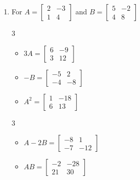 \documentclass{ximera}
\begin{document}
	\author{Stitz-Zeager}




\begin{enumerate}

\item For  $A = \left[ \begin{array}{rr} 2 & -3 \\ 1 & 4 \end{array} \right]$ and $B=\left[ \begin{array}{rr} 5 & -2 \\ 4 & 8 \end{array} \right]$ 

\begin{multicols}{3}
\begin{itemize}
\item  $3A = \left[ \begin{array}{rr} 6 & -9 \\ 3 & 12 \end{array} \right]$

\item $-B = \left[ \begin{array}{rr} -5 & 2 \\ -4 & -8 \end{array} \right]$

\item $A^2 = \left[ \begin{array}{rr} 1 & -18 \\ 6 & 13 \end{array} \right]$

\end{itemize}
\end{multicols}


\begin{multicols}{3}
\begin{itemize}
\item  $A-2B = \left[ \begin{array}{rr} -8 & 1 \\ -7 & -12 \end{array} \right]$

\item $AB = \left[ \begin{array}{rr} -2 & -28 \\ 21 & 30 \end{array} \right]$


\end{itemize}
\end{multicols}
\end{enumerate}
\end{document}
